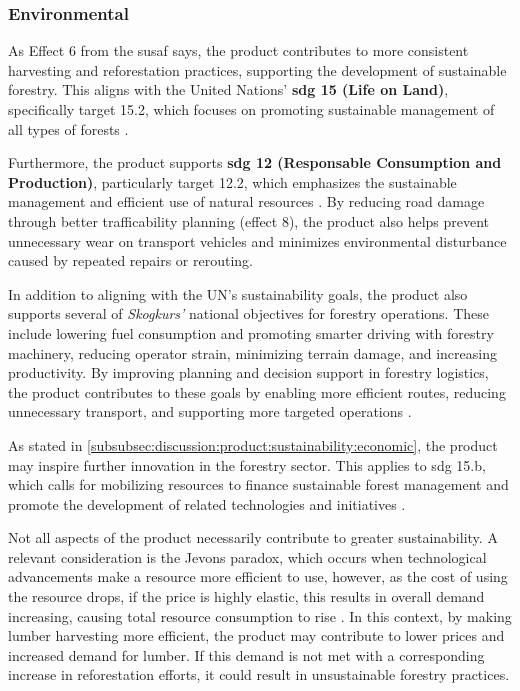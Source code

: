 \subsubsection{Environmental}

As Effect 6 from the \acrshort{susaf} says, the product contributes to more consistent harvesting and reforestation practices, supporting the development of sustainable forestry. This aligns with the United Nations' \textbf{\acrshort{sdg} 15 (Life on Land)}, specifically target 15.2, which focuses on promoting sustainable management of all types of forests \cite{sdgsgoals}.

Furthermore, the product supports \textbf{\acrshort{sdg} 12 (Responsable Consumption and Production)}, particularly target 12.2, which emphasizes the sustainable management and efficient use of natural resources \cite{sdgsgoals}. By reducing road damage through better trafficability planning (effect 8), the product also helps prevent unnecessary wear on transport vehicles and minimizes environmental disturbance caused by repeated repairs or rerouting.

In addition to aligning with the UN's sustainability goals, the product also supports several of \textit{Skogkurs'} national objectives for forestry operations. These include lowering fuel consumption and promoting smarter driving with forestry machinery, reducing operator strain, minimizing terrain damage, and increasing productivity. By improving planning and decision support in forestry logistics, the product contributes to these goals by enabling more efficient routes, reducing unnecessary transport, and supporting more targeted operations \cite{skogkurs_baerekraft}.

As stated in \autoref{subsubsec:discussion:product:sustainability:economic}, the product may inspire further innovation in the forestry sector. This applies to \acrshort{sdg} 15.b, which calls for mobilizing resources to finance sustainable forest management and promote the development of related technologies and initiatives \cite{sdgsgoals}.

Not all aspects of the product necessarily contribute to greater sustainability. A relevant consideration is the Jevons paradox, which  occurs when technological advancements make a resource more efficient to use, however, as the cost of using the resource drops, if the price is highly elastic, this results in overall demand increasing, causing total resource consumption to rise \cite{jevonsparadoxwiki}. In this context, by making lumber harvesting more efficient, the product may contribute to lower prices and increased demand for lumber. If this demand is not met with a corresponding increase in reforestation efforts, it could result in unsustainable forestry practices.

